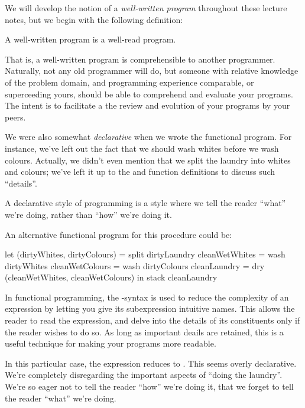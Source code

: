 We will develop the notion of a \emph{well-written program} throughout these
lecture notes, but we begin with the following definition:

\begin{definition}

A well-written program is a well-read program.

\end{definition}

That is, a well-written program is comprehensible to another programmer.
Naturally, not any old programmer will do, but someone with relative knowledge
of the problem domain, and programming experience comparable, or superceeding
yours, should be able to comprehend and evaluate your programs. The intent is
to facilitate a the review and evolution of your programs by your peers.

We were also somewhat \emph{declarative} when we wrote the functional program.
For instance, we've left out the fact that we should wash whites before we wash
colours. Actually, we didn't even mention that we split the laundry into whites
and colours; we've left it up to the  and  function
definitions to discuss such ``details''.

\begin{definition}

A declarative style of programming is a style where we tell the reader ``what''
we're doing, rather than ``how'' we're doing it.

\end{definition}

An alternative functional program for this procedure could be:

\begin{code}
let
  (dirtyWhites, dirtyColours) = split dirtyLaundry
  cleanWetWhites = wash dirtyWhites
  cleanWetColours = wash dirtyColours
  cleanLaundry = dry (cleanWetWhites, cleanWetColours)
in
  stack cleanLaundry
\end{code}

In functional programming, the -syntax is used to reduce the
complexity of an expression by letting you give its subexpression intuitive
names. This allows the reader to read the expression, and delve into the
details of its constituents only if the reader wishes to do so. As long as
important deails are retained, this is a useful technique for making your
programs more readable.

In this particular case, the expression reduces to . This seems overly declarative. We're completely disregarding the
important aspects of ``doing the laundry''. We're so eager not to tell the
reader ``how'' we're doing it, that we forget to tell the reader ``what'' we're
doing.


